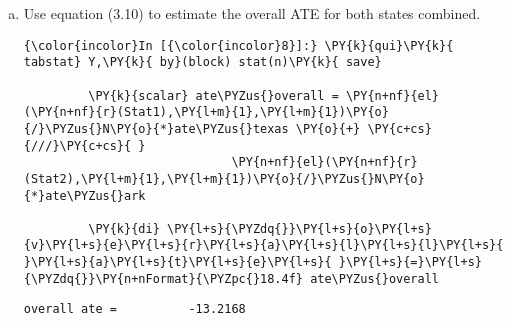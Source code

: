 \documentclass[11pt,notitlepage]{article}\usepackage[]{graphicx}\usepackage[]{color}
\makeatletter
\newenvironment{kframe}{%
 \def\at@end@of@kframe{}%
 \ifinner\ifhmode%
  \def\at@end@of@kframe{\end{minipage}}%
  \begin{minipage}{\columnwidth}%
 \fi\fi%
 \def\FrameCommand##1{\hskip\@totalleftmargin \hskip-\fboxsep
 \colorbox{shadecolor}{##1}\hskip-\fboxsep
     \hskip-\linewidth \hskip-\@totalleftmargin \hskip\columnwidth}%
 \MakeFramed {\advance\hsize-\width
   \@totalleftmargin\z@ \linewidth\hsize
   \@setminipage}}%
 {\par\unskip\endMakeFramed%
 \at@end@of@kframe}
\newenvironment{knitrout}{}{} %
\makeatother
\begin{document}
\begin{enumerate}[a)]
\begin{knitrout}
\begin{kframe}
    \begin{Verbatim}[commandchars=\\\{\}]
se\_texas =          9.345871

    \end{Verbatim}

    \begin{Verbatim}[commandchars=\\\{\}]
{\color{incolor}In [{\color{incolor}7}]:} \PY{k}{di} \PY{l+s}{\PYZdq{}}\PY{l+s}{s}\PY{l+s}{e}\PY{l+s}{\PYZus{}}\PY{l+s}{a}\PY{l+s}{r}\PY{l+s}{k}\PY{l+s}{a}\PY{l+s}{n}\PY{l+s}{s}\PY{l+s}{a}\PY{l+s}{s}\PY{l+s}{ }\PY{l+s}{=}\PY{l+s}{\PYZdq{}}\PY{n+nFormat}{\PYZpc{}18.6f} se\PYZus{}arkansas
\end{Verbatim}

    \begin{Verbatim}[commandchars=\\\{\}]
se\_arkansas =          3.395979

    \end{Verbatim}
\end{kframe}
\end{knitrout}

The estimated se in Texas is 9.346.  In Arkansas, the estimated se is 3.396.

\item Use equation (3.10) to estimate the overall ATE for both states combined.
\begin{knitrout}
\color{fgcolor}\begin{kframe}
   \begin{Verbatim}[commandchars=\\\{\}]
{\color{incolor}In [{\color{incolor}8}]:} \PY{k}{qui}\PY{k}{ tabstat} Y,\PY{k}{ by}(block) stat(n)\PY{k}{ save}	
         
         \PY{k}{scalar} ate\PYZus{}overall = \PY{n+nf}{el}(\PY{n+nf}{r}(Stat1),\PY{l+m}{1},\PY{l+m}{1})\PY{o}{/}\PYZus{}N\PY{o}{*}ate\PYZus{}texas \PY{o}{+} \PY{c+cs}{///}\PY{c+cs}{ }
         					 \PY{n+nf}{el}(\PY{n+nf}{r}(Stat2),\PY{l+m}{1},\PY{l+m}{1})\PY{o}{/}\PYZus{}N\PY{o}{*}ate\PYZus{}ark
         
         \PY{k}{di} \PY{l+s}{\PYZdq{}}\PY{l+s}{o}\PY{l+s}{v}\PY{l+s}{e}\PY{l+s}{r}\PY{l+s}{a}\PY{l+s}{l}\PY{l+s}{l}\PY{l+s}{ }\PY{l+s}{a}\PY{l+s}{t}\PY{l+s}{e}\PY{l+s}{ }\PY{l+s}{=}\PY{l+s}{\PYZdq{}}\PY{n+nFormat}{\PYZpc{}18.4f} ate\PYZus{}overall
\end{Verbatim}

    \begin{Verbatim}[commandchars=\\\{\}]
overall ate =          -13.2168
    \end{Verbatim}
\end{kframe}
\end{knitrout}


\end{enumerate}
\end{document}
